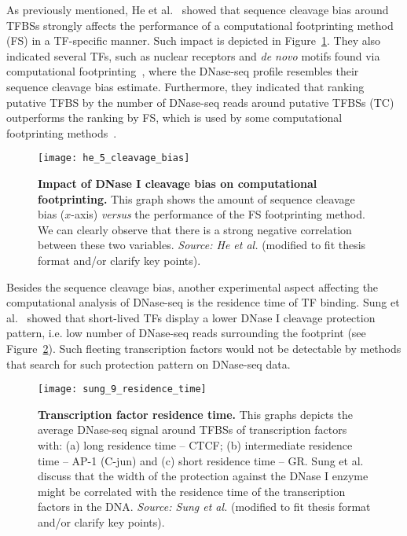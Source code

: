 As previously mentioned, He et al.~\cite{he2014} showed that sequence cleavage bias around TFBSs strongly affects the performance of a computational footprinting method (FS) in a TF-specific manner. Such impact is depicted in Figure~\ref{fig:he_cleavage_bias}. They also indicated several TFs, such as nuclear receptors and \emph{de novo} motifs found via computational footprinting~\cite{neph2012a}, where the DNase-seq profile resembles their sequence cleavage bias estimate. Furthermore, they indicated that ranking putative TFBS by the number of DNase-seq reads around putative TFBSs (TC) outperforms the ranking by FS, which is used by some computational footprinting methods~\cite{hesselberth2009,neph2012a}.

\begin{figure}[h!]
\centering
\texttt{[image: he\_5\_cleavage\_bias]}
\caption[Impact of DNase I cleavage bias on computational footprinting]{\textbf{Impact of DNase I cleavage bias on computational footprinting.} This graph shows the amount of sequence cleavage bias ($x$-axis) \emph{versus} the performance of the FS footprinting method. We can clearly observe that there is a strong negative correlation between these two variables. \emph{Source: He et al.}\cite{he2014} (modified to fit thesis format and/or clarify key points).}
\label{fig:he_cleavage_bias}
\end{figure}

Besides the sequence cleavage bias, another experimental aspect affecting the computational analysis of DNase-seq is the residence time of TF binding. Sung et al.~\cite{sung2014} showed that short-lived TFs display a lower DNase I cleavage protection pattern, i.e. low number of DNase-seq reads surrounding the footprint (see Figure~\ref{fig:sung_residence_time}). Such fleeting transcription factors would not be detectable by methods that search for such protection pattern on DNase-seq data.

\begin{figure}[h!]
\centering
\texttt{[image: sung\_9\_residence\_time]}
\caption[Transcription factor residence time]{\textbf{Transcription factor residence time.} This graphs depicts the average DNase-seq signal around TFBSs of transcription factors with: (a) long residence time -- CTCF; (b) intermediate residence time -- AP-1 (C-jun) and (c) short residence time -- GR. Sung et al.~\cite{sung2014} discuss that the width of the protection against the DNase I enzyme might be correlated with the residence time of the transcription factors in the DNA. \emph{Source: Sung et al.}\cite{sung2014} (modified to fit thesis format and/or clarify key points).}
\label{fig:sung_residence_time}
\end{figure}

